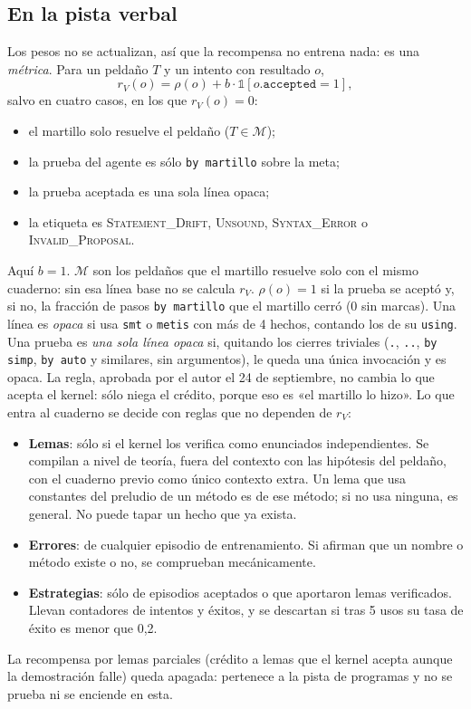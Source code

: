 \documentclass[11pt,a4paper]{article}
\begin{document}
\subsection{En la pista verbal}
Los pesos no se actualizan, así que la recompensa no entrena nada: es una \emph{métrica}. Para un peldaño $T$ y un intento con resultado $o$,
\[
  r_V(o) = \rho(o) + b\cdot\mathbb{1}[o.\texttt{accepted} = 1],
\]
salvo en cuatro casos, en los que $r_V(o) = 0$:
\begin{itemize}
  \item el martillo solo resuelve el peldaño ($T \in \mathcal{M}$);
  \item la prueba del agente es sólo \texttt{by martillo} sobre la meta;
  \item la prueba aceptada es una sola línea opaca;
  \item la etiqueta es \textsc{Statement\_Drift}, \textsc{Unsound}, \textsc{Syntax\_Error} o \textsc{Invalid\_Proposal}.
\end{itemize}
Aquí $b = 1$. $\mathcal{M}$ son los peldaños que el martillo resuelve solo con el mismo cuaderno: sin esa línea base no se calcula $r_V$. $\rho(o) = 1$ si la prueba se aceptó y, si no, la fracción de pasos \texttt{by martillo} que el martillo cerró (0 sin marcas). Una línea es \emph{opaca} si usa \texttt{smt} o \texttt{metis} con más de 4 hechos, contando los de su \texttt{using}. Una prueba es \emph{una sola línea opaca} si, quitando los cierres triviales (\texttt{.}, \texttt{..}, \texttt{by simp}, \texttt{by auto} y similares, sin argumentos), le queda una única invocación y es opaca. La regla, aprobada por el autor el 24 de septiembre, no cambia lo que acepta el kernel: sólo niega el crédito, porque eso es «el martillo lo hizo». Lo que entra al cuaderno se decide con reglas que no dependen de $r_V$:
\begin{itemize}
  \item \textbf{Lemas}: sólo si el kernel los verifica como enunciados independientes. Se compilan a nivel de teoría, fuera del contexto con las hipótesis del peldaño, con el cuaderno previo como único contexto extra. Un lema que usa constantes del preludio de un método es de ese método; si no usa ninguna, es general. No puede tapar un hecho que ya exista.
  \item \textbf{Errores}: de cualquier episodio de entrenamiento. Si afirman que un nombre o método existe o no, se comprueban mecánicamente.
  \item \textbf{Estrategias}: sólo de episodios aceptados o que aportaron lemas verificados. Llevan contadores de intentos y éxitos, y se descartan si tras 5 usos su tasa de éxito es menor que 0{,}2.
\end{itemize}
La recompensa por lemas parciales (crédito a lemas que el kernel acepta aunque la demostración falle) queda apagada: pertenece a la pista de programas y no se prueba ni se enciende en esta.
\end{document}
